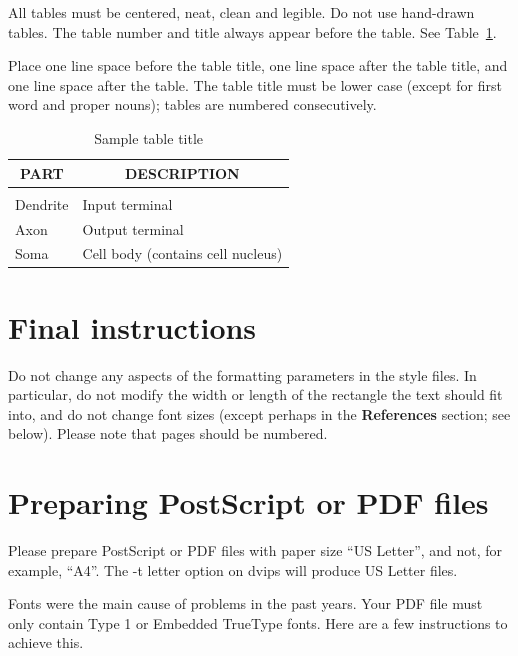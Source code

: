 \documentclass{article} %
\begin{document}
All tables must be centered, neat, clean and legible. Do not use hand-drawn
tables. The table number and title always appear before the table. See
Table~\ref{sample-table}.

Place one line space before the table title, one line space after the table
title, and one line space after the table. The table title must be lower case
(except for first word and proper nouns); tables are numbered consecutively.

\begin{table}[t]
\caption{Sample table title}
\label{sample-table}
\begin{center}
\begin{tabular}{ll}
\multicolumn{1}{c}{\bf PART}  &\multicolumn{1}{c}{\bf DESCRIPTION}
\\ \hline \\
Dendrite         &Input terminal \\
Axon             &Output terminal \\
Soma             &Cell body (contains cell nucleus) \\
\end{tabular}
\end{center}
\end{table}

\section{Final instructions}
Do not change any aspects of the formatting parameters in the style files.
In particular, do not modify the width or length of the rectangle the text
should fit into, and do not change font sizes (except perhaps in the
\textbf{References} section; see below). Please note that pages should be
numbered.

\section{Preparing PostScript or PDF files}

Please prepare PostScript or PDF files with paper size ``US Letter'', and
not, for example, ``A4''. The -t
letter option on dvips will produce US Letter files.

Fonts were the main cause of problems in the past years. Your PDF file must
only contain Type 1 or Embedded TrueType fonts. Here are a few instructions
to achieve this.
\end{document}
